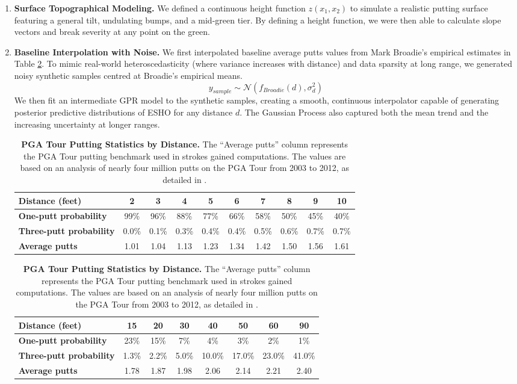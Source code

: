 \documentclass[11pt, letterpaper]{article}
\begin{document}
\begin{enumerate}
    \item \textbf{Surface Topographical Modeling.} We defined a continuous height function $z(x_1, x_2)$ to simulate a realistic putting surface featuring a general tilt, undulating bumps, and a mid-green tier. By defining a height function, we were then able to calculate slope vectors and break severity at any point on the green.
    \item \textbf{Baseline Interpolation with Noise.} We first interpolated baseline average putts values from Mark Broadie's empirical estimates in Table \ref{tab: ESHO_Putts}. 
    To mimic real-world heteroscedasticity (where variance increases with distance) and data sparsity at long range, we generated noisy synthetic samples centred  at Broadie's empirical means.
\[ y_{sample} \sim \mathcal{N}(f_{Broadie}(d), \sigma_d^2) \]
We then fit an intermediate GPR model to the synthetic samples, creating a smooth, continuous interpolator capable of generating posterior predictive distributions of ESHO for any distance $d$. The Gaussian Process also captured both the mean trend and the increasing uncertainty at longer ranges.
\begin{table}[h!]
    \centering
    \scriptsize
    \caption{\textbf{PGA Tour Putting Statistics by Distance.} The ``Average putts'' column represents the PGA Tour putting benchmark used in strokes gained computations. The values are based on an analysis of nearly four million putts on the PGA Tour from 2003 to 2012, as detailed in \parencite{Broadie_2014a}.}
    \label{tab: ESHO_Putts}
    \renewcommand{\arraystretch}{1.2}
    \begin{tabular}{l|*{9}{c}}
        \toprule
        \textbf{Distance (feet)} & 2 & 3 & 4 & 5 & 6 & 7 & 8 & 9 & 10 \\
        \midrule
        \textbf{One-putt probability} & 99\% & 96\% & 88\% & 77\% & 66\% & 58\% & 50\% & 45\% & 40\% \\
        \textbf{Three-putt probability} & 0.0\% & 0.1\% & 0.3\% & 0.4\% & 0.4\% & 0.5\% & 0.6\% & 0.7\% & 0.7\% \\
        \textbf{Average putts} & 1.01 & 1.04 & 1.13 & 1.23 & 1.34 & 1.42 & 1.50 & 1.56 & 1.61 \\
        \bottomrule
    \end{tabular}
    
    \vspace{0.2cm} 

    \begin{tabular}{l|*{7}{c}}
        \toprule
        \textbf{Distance (feet)} & 15 & 20 & 30 & 40 & 50 & 60 & 90  \\
        \midrule
        \textbf{One-putt probability} & 23\% & 15\% & 7\% & 4\% & 3\% & 2\% & 1\%   \\
        \textbf{Three-putt probability} & 1.3\% & 2.2\% & 5.0\% & 10.0\% & 17.0\% & 23.0\% & 41.0\%  \\
        \textbf{Average putts} & 1.78 & 1.87 & 1.98 & 2.06 & 2.14 & 2.21 & 2.40  \\
        \bottomrule
    \end{tabular}
\end{table}


\end{enumerate}
\end{document}
